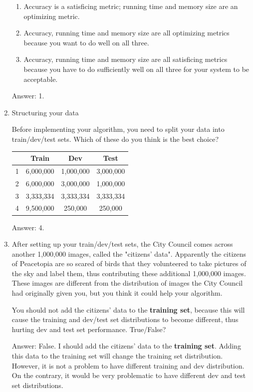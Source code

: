 \documentclass[12pt]{article}
\numberwithin{equation}{section}
\begin{document}
\begin{enumerate}
\begin{enumerate}
		\item Accuracy is a satisficing metric; running time and memory size are an optimizing metric.
		\item Accuracy, running time and memory size are all optimizing metrics because you want to do well on all three.
		\item Accuracy, running time and memory size are all satisficing metrics because you have to do sufficiently well on all three for your system to be acceptable.
		\end{enumerate} \par
	Answer: 1.
	\item Structuring your data \par
	Before implementing your algorithm, you need to split your data into train/dev/test sets. Which of these do you think is the best choice? 
	\begin{table}[h!]
  		\centering
  		\begin{tabular}{c|c|c|c}
   			& Train & Dev & Test \\
   			\hline
    			1 & 6,000,000 & 1,000,000 & 3,000,000\\
			2 & 6,000,000 & 3,000,000 & 1,000,000\\
			3 & 3,333,334 & 3,333,334 & 3,333,334\\
			4 & 9,500,000 & 250,000 & 250,000\\
  		\end{tabular}
	\end{table} \par
	Answer: 4.
	\item After setting up your train/dev/test sets, the City Council comes across another 1,000,000 images, called the "citizens' data". Apparently the citizens of Peacetopia are so scared of birds that they volunteered to take pictures of the sky and label them, thus contributing these additional 1,000,000 images. These images are different from the distribution of images the City Council had originally given you, but you think it could help your algorithm. \par
	You should not add the citizens' data to the \textbf{training set}, because this will cause the training and dev/test set distributions to become different, thus hurting dev and test set performance. True/False? \par
	Answer: False. I should add the citizens' data to the \textbf{training set}. Adding this data to the training set will change the training set distribution. However, it is not a problem to have different training and dev distribution. On the contrary, it would be very problematic to have different dev and test set distributions.

\end{enumerate}
\end{document}

